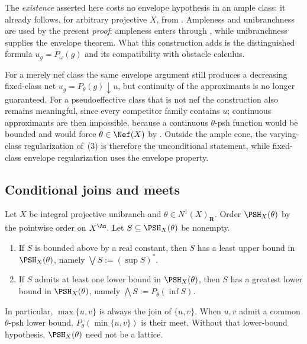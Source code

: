 \begin{remark}
\label{rem:ch45-fixed-class-cost}
The \emph{existence} asserted here costs no envelope hypothesis in an ample
class: it already follows, for arbitrary projective $X$, from
.  Ampleness and unibranchness are used by
the present \emph{proof}: ampleness enters through
, while unibranchness supplies the
envelope theorem.  What this construction adds is the distinguished formula
$u_g=P_\omega(g)$ and its compatibility with obstacle calculus.

For a merely nef class the same envelope argument still produces a
decreasing fixed-class net $u_g=P_\theta(g)\downarrow u$, but continuity
of the approximants is no longer guaranteed.  For a pseudoeffective class
that is not nef the construction also remains meaningful, since every
competitor family contains $u$; continuous approximants are then
impossible, because a continuous $\theta$-psh function would be bounded
and would force $\theta\in\Nef(X)$ by
.  Outside the ample cone, the varying-class
regularization of \,(3) is therefore the unconditional
statement, while fixed-class envelope regularization uses the envelope
property.
\end{remark}

\subsection{Conditional joins and meets}
\label{sec:ch45-lattice}

\begin{theorem}
\label{thm:ch45-lattice}
Let $X$ be integral projective unibranch and
$\theta\in N^1(X)_{\mathbf R}$.  Order $\PSH_X(\theta)$ by the pointwise
order on $X^{\An}$.  Let $S\subseteq\PSH_X(\theta)$ be nonempty.
\begin{enumerate}
\item\label{itm:ch45-lat:join}
      If $S$ is bounded above by a real constant, then $S$ has a least
      upper bound in $\PSH_X(\theta)$, namely
      $\bigvee S:=(\sup S)^*$.
\item\label{itm:ch45-lat:meet}
      If $S$ admits at least one lower bound in $\PSH_X(\theta)$, then
      $S$ has a greatest lower bound in $\PSH_X(\theta)$, namely
      $\bigwedge S:=P_\theta(\inf S)$.
\end{enumerate}
In particular, $\max\{u,v\}$ is always the join of $\{u,v\}$.  When
$u,v$ admit a common $\theta$-psh lower bound,
$P_\theta(\min\{u,v\})$ is their meet.  Without that lower-bound
hypothesis, $\PSH_X(\theta)$ need not be a lattice.
\end{theorem}

